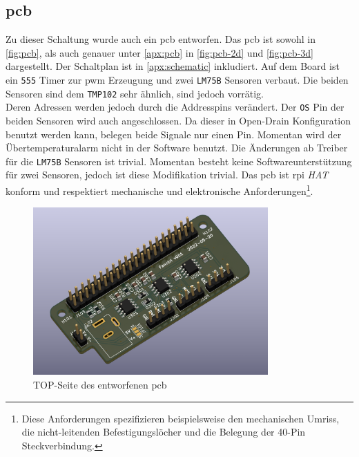 \subsection{\acrshort{pcb}}

Zu dieser Schaltung wurde auch ein \gls{pcb} entworfen.
Das \gls{pcb} ist sowohl in \autoref{fig:pcb}, als auch genauer unter \autoref{apx:pcb} in \autoref{fig:pcb-2d} und \autoref{fig:pcb-3d} dargestellt.
Der Schaltplan ist in \autoref{apx:schematic} inkludiert.
Auf dem Board ist ein \texttt{555} Timer zur \gls{pwm} Erzeugung und zwei \texttt{LM75B} Sensoren verbaut.
Die beiden Sensoren sind dem \texttt{TMP102} sehr ähnlich, sind jedoch vorrätig.\\
Deren Adressen werden jedoch durch die Addresspins verändert.
Der \texttt{OS} Pin der beiden Sensoren wird auch angeschlossen.
Da dieser in Open-Drain Konfiguration benutzt werden kann, belegen beide Signale nur einen Pin.
Momentan wird der Übertemperaturalarm nicht in der Software benutzt.
Die Änderungen ab Treiber für die \texttt{LM75B} Sensoren ist trivial.
Momentan besteht keine Softwareunterstützung für zwei Sensoren, jedoch ist diese Modifikation trivial.
Das \gls{pcb} ist \gls{rpi} \textit{HAT} konform und respektiert mechanische und elektronische Anforderungen\footnote{Diese Anforderungen spezifizieren beispielsweise den mechanischen Umriss, die nicht-leitenden Befestigungslöcher und die Belegung der 40-Pin Steckverbindung.}.

\begin{figure}[h]
    \centering
    \includegraphics[width=9cm]{./img/pcb-3d-top.png}
    \caption{TOP-Seite des entworfenen \gls{pcb}}
    \label{fig:pcb}
\end{figure}
